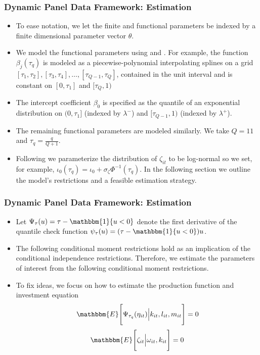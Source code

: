 \documentclass{beamer}
\begin{document}

\begin{frame}
\frametitle{Dynamic Panel Data Framework: Estimation}
\begin{itemize}
	\item To ease notation, we let the finite and functional parameters be indexed by a finite dimensional parameter vector $\theta$. 
	\item We model the functional parameters using \cite{Wei2009} and \cite{Arellano2016}. For example, the function $\beta_{j}(\tau_{q})$ is modeled as a piecewise-polynomial interpolating splines on a grid $[\tau_{1},\tau_{2}], [\tau_{3},\tau_{4}],\dots, [\tau_{Q-1},\tau_{Q}]$, contained in the unit interval and is constant on $[0, \tau_{1}]$ and $[\tau_{Q}, 1)$ 
	\item The intercept coefficient $\beta_{0}$ is specified as the quantile of an exponential distribution on $(0,\tau_{1}]$ (indexed by $\lambda^{-}$) and $[\tau_{Q-1}, 1)$ (indexed by $\lambda^{+}$). 
	\item The remaining functional parameters are modeled similarly. We take $Q=11$ and $\tau_{q}=\frac{q}{Q+1}$. 
	\item Following \cite{Arellano2017} we parameterize the distribution of $\zeta_{it}$ to be log-normal so we set, for example, $\iota_{0}(\tau_{q})=\iota_{0}+\sigma_{\zeta}\Phi^{-1}(\tau_{q})$. In the following section we outline the model's restrictions and a feasible estimation strategy.
\end{itemize}
\end{frame}


\begin{frame}
\frametitle{Dynamic Panel Data Framework: Estimation}
\begin{itemize}
	\item Let $\Psi_{\tau}(u)=\tau-\mathbbm{1}\{u<0\}$ denote the first derivative of the quantile check function $\psi_{\tau}(u)=(\tau-\mathbbm{1}\{u<0\})u$. 
	\item The following conditional moment restrictions hold as an implication of the conditional independence restrictions. Therefore, we estimate the parameters of interest from the following conditional moment restrictions.
	\item To fix ideas, we focus on how to estimate the production function and investment equation
	\begin{equation}\label{ymoment}
	\mathbbm{E}\Bigg[\Psi_{\tau_{q}}(\eta_{it})\Big|k_{it}, l_{it}, m_{it}\Bigg]=0
	\end{equation}
	\begin{equation}\label{iemoment}
	\mathbbm{E}\Bigg[\zeta_{it}\Big|\omega_{it}, k_{it}\Bigg]=0
	\end{equation}
\end{itemize}
\end{frame}
\end{document}
